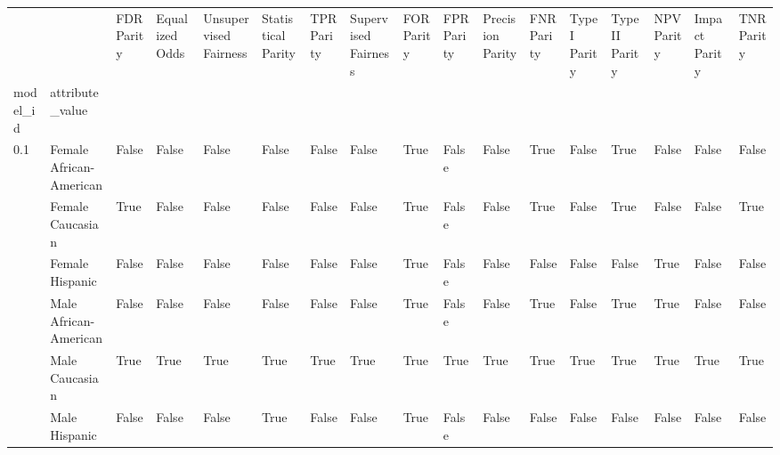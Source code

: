 \begin{tabular}{lllllllllllllllll}
\toprule
    &               &  FDR Parity &  Equalized Odds &  Unsupervised Fairness &  Statistical Parity &  TPR Parity &  Supervised Fairness &  FOR Parity &  FPR Parity &  Precision Parity &  FNR Parity &  TypeI Parity &  TypeII Parity &  NPV Parity &  Impact Parity &  TNR Parity \\
model\_id & attribute\_value &             &                 &                        &                     &             &                      &             &             &                   &             &               &                &             &                &             \\
\midrule
0.1 & Female African-American &       False &           False &                  False &               False &       False &                False &        True &       False &             False &        True &         False &           True &       False &          False &       False \\
    & Female Caucasian &        True &           False &                  False &               False &       False &                False &        True &       False &             False &        True &         False &           True &       False &          False &        True \\
    & Female Hispanic &       False &           False &                  False &               False &       False &                False &        True &       False &             False &       False &         False &          False &        True &          False &       False \\
    & Male African-American &       False &           False &                  False &               False &       False &                False &        True &       False &             False &        True &         False &           True &        True &          False &       False \\
    & Male Caucasian &        True &            True &                   True &                True &        True &                 True &        True &        True &              True &        True &          True &           True &        True &           True &        True \\
    & Male Hispanic &       False &           False &                  False &                True &       False &                False &        True &       False &             False &       False &         False &          False &       False &          False &       False \\

\end{tabular}
